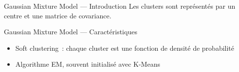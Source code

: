 \begin{frame}{Gaussian Mixture Model --- Introduction}
  Les clusters sont représentés par un centre et une matrice de covariance.
\end{frame}

\begin{frame}{Gaussian Mixture Model --- Caractéristiques}
  \begin{itemize}[<+->]
    \item \og{}Soft\fg{} clustering~: chaque cluster est une fonction de densité de probabilité
    \item Algorithme EM, souvent initialisé avec K-Means
  \end{itemize}
\end{frame}
